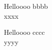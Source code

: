 \documentclass{beamer}
\begin{document}
\begin{frame}{Helloooo}
	bbbb\\

	xxxx
\end{frame}

\begin{frame}{Helloooo}
	cccc\\

	yyyy
\end{frame}
\end{document}
